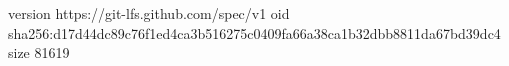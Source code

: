 version https://git-lfs.github.com/spec/v1
oid sha256:d17d44dc89c76f1ed4ca3b516275c0409fa66a38ca1b32dbb8811da67bd39dc4
size 81619
